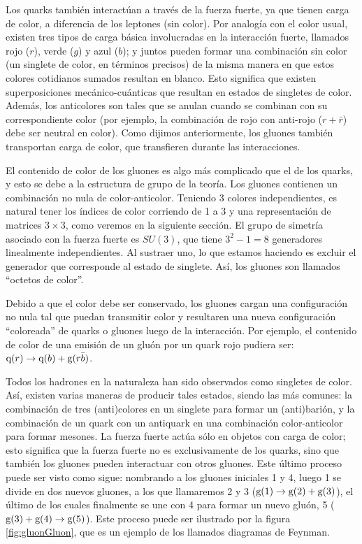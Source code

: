 Los quarks también interactúan a través de la fuerza fuerte, ya que tienen carga de color, a diferencia de los leptones (sin color). Por analogía con el color usual, existen tres tipos de carga básica involucradas en la interacción fuerte, llamados rojo ($r$), verde ($g$) y azul ($b$); y juntos pueden formar una combinación sin color (un singlete de color, en términos precisos) de la misma manera en que estos colores cotidianos sumados resultan en blanco. Esto significa que existen superposiciones mecánico-cuánticas que resultan en estados de singletes de color. Además, los anticolores son tales que se anulan cuando se combinan con su correspondiente color (por ejemplo, la combinación de rojo con anti-rojo ($r+\bar{r}$) debe ser neutral en color). Como dijimos anteriormente, los gluones también transportan carga de color, que transfieren durante las interacciones.

El contenido de color de los gluones es algo más complicado que el de los quarks, y esto se debe a la estructura de grupo de la teoría. Los gluones contienen un combinación no nula de color-anticolor. Teniendo 3 colores independientes, es natural tener los índices de color corriendo de 1 a 3 y una representación de matrices $3\times3$, como veremos en la siguiente sección. El grupo de simetría asociado con la fuerza fuerte es $SU(3)$, que tiene $3^2-1=8$ generadores linealmente independientes. Al sustraer uno, lo que estamos haciendo es excluir el generador que corresponde al estado de singlete. Así, los gluones son llamados ``octetos de color''.

Debido a que el color debe ser conservado, los gluones cargan una configuración no nula tal que puedan transmitir color y resultaren una nueva configuración ``coloreada'' de quarks o gluones luego de la interacción. Por ejemplo, el contenido de color de una emisión de un gluón por un quark rojo pudiera ser: ${\mathrm q}(r)\to{\mathrm q}(b)+{\mathrm g}(r\bar b)$.

Todos los hadrones en la naturaleza han sido observados como singletes de color. Así, existen varias maneras de producir tales estados, siendo las más comunes: la combinación de tres (anti)colores en un singlete para formar un (anti)barión, y la combinación de un quark con un antiquark en una combinación color-anticolor para formar mesones. La fuerza fuerte actúa sólo en objetos con carga de color; esto significa que la fuerza fuerte no es exclusivamente de los quarks, sino que también los gluones pueden interactuar con otros gluones. Este último proceso puede ser visto como sigue: nombrando a los gluones iniciales 1 y 4, luego 1 se divide en dos nuevos gluones, a los que llamaremos 2 y 3 (${\mathrm g}(1)\to{\mathrm g}(2)+{\mathrm g}(3)$), el último de los cuales finalmente se une con 4 para formar un nuevo gluón, 5 (${\mathrm g}(3)+{\mathrm g}(4)\to{\mathrm g}(5)$). Este proceso puede ser ilustrado por la figura \ref{fig:gluonGluon}, que es un ejemplo de los llamados diagramas de Feynman.

